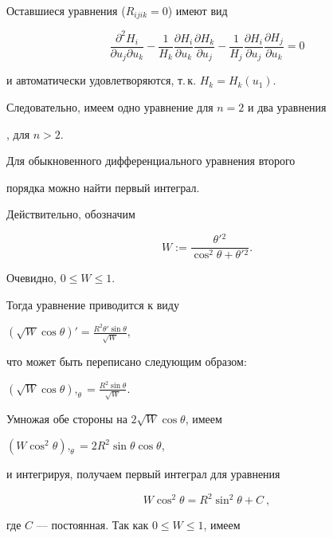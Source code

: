 Оставшиеся уравнения ($R_{ijik}=0$) имеют вид


$$


\frac{\partial^2 H_i}{\partial u_j \partial u_k} -


\frac{1}{H_k} \frac{\partial H_i}{\partial u_k} 


\frac{\partial H_k}{\partial u_j} - \frac{1}{H_j}


\frac{\partial H_i}{\partial u_j} 


\frac{\partial H_j}{\partial u_k} = 0 


$$ 


и автоматически удовлетворяются, т.\,к. $H_k = H_k (u_1)$.


Следовательно, имеем одно уравнение  для $n=2$ и два уравнения


,  для $n>2$.


Для обыкновенного дифференциального уравнения второго


порядка  можно найти первый интеграл.


Действительно, обозначим


\begin{equation}


\label{W}


W := \frac{\theta'{}^2}{\cos^2\theta+ \theta'{}^2}.


\end{equation}


Очевидно, $0\leq W \leq 1$.


Тогда уравнение  приводится к виду


$(\sqrt{W} \cos\theta)' = \frac{R^2 \theta' \sin\theta }{\sqrt{W}}$,


что может быть переписано следующим образом:


$(\sqrt{W} \cos\theta),_\theta = \frac{R^2 \sin\theta}{\sqrt{W}}$.


Умножая обе стороны на $2\sqrt{W}\cos\theta$, имеем


$(W \cos^2\theta),_\theta = 2 R^2 \sin\theta \cos\theta$, 


и интегрируя, получаем первый интеграл для уравнения 


\begin{equation} \label{firstint}


W \cos^2\theta = R^2 \sin^2\theta + C \ ,


\end{equation}


где $C$ --- постоянная. Так как $0\leq W \leq 1$, имеем


